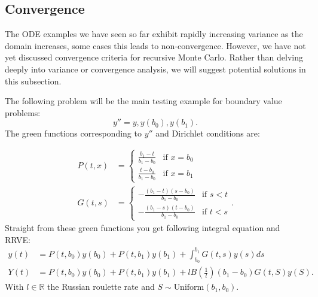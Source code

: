 \documentclass[a4paper,12pt]{article}
\begin{document}

\subsection{Convergence}

The ODE examples we have seen so far exhibit rapidly increasing variance as the domain increases,
some cases this leads to non-convergence. However, we have not yet discussed convergence
criteria for recursive Monte Carlo. Rather than delving deeply into variance
or convergence analysis, we will suggest potential solutions in this subsection.

\begin{example}[Dirichlet $y''=y$] \label{main dirichlet}
    The following problem will be the main testing example for
    boundary value problems:
    \begin{equation} \label{eq:main dirichlet}
        y''=y, y(b_{0}),y(b_{1}).
    \end{equation}
    The green functions corresponding to $y''$ and Dirichlet conditions are:

    \begin{align*}
        P(t,x) & = \begin{cases}
                       \frac{b_{1}-t}{b_{1}-b_{0}} & \text{if } x = b_{0} \\
                       \frac{t-b_{0}}{b_{1}-b_{0}} & \text{if } x = b_{1}
                   \end{cases}       \\
        G(t,s) & = \begin{cases}
                       -\frac{(b_{1}-t)(s-b_{0})}{b_{1}-b_{0}} & \text{if } s<t \\
                       -\frac{(b_{1}-s)(t-b_{0})}{b_{1}-b_{0}} & \text{if } t<s
                   \end{cases}.
    \end{align*}
    Straight from these green functions you get following integral equation and RRVE:
    \begin{align} \label{eq:main dirichlet}
        y(t) & = P(t,b_{0}) y(b_{0}) + P(t,b_{1}) y(b_{1}) + \int_{b_{0}}^{b_{1}} G(t,s)y(s) ds \\
        Y(t) & = P(t,b_{0}) y(b_{0}) + P(t,b_{1}) y(b_{1})
        + l B\left(\frac{1}{l} \right)(b_{1}-b_{0}) G(t,S)y(S) . \label{RRVE:main dirichlet}
    \end{align}
    With $l \in \mathbb{R}$ the Russian roulette rate and $S \sim \text{Uniform}(b_{1},b_{0})$.

\end{example}
\end{document}
